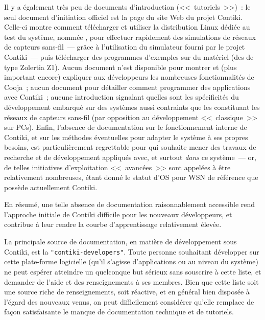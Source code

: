 Il y a également très peu de documents d'introduction (<<~tutoriels~>>)~:
le seul document d'initiation officiel est la page  du
site Web du projet Contiki. Celle-ci montre comment télécharger et utiliser
la distribution Linux dédiée au test du système, nommée , pour effectuer rapidement des simulations de réseaux de capteurs
sans-fil~--- grâce à l'utilisation du simulateur  \cite{Cooja}
fourni par le projet Contiki~--- puis télécharger des programmes d'exemples
sur du matériel (des  de type Zolertia Z1). Aucun document n'est
disponible pour montrer et (plus important encore) expliquer aux
développeurs les nombreuses fonctionnalités de Cooja~; aucun document pour
détailler comment programmer des applications avec Contiki~; aucune
introduction signalant quelles sont les spécificités du développement
embarqué sur des systèmes aussi contraints que les  constituant
les réseaux de capteurs sans-fil (par opposition au développement
<<~classique~>> sur PCs). Enfin, l'absence de documentation sur le
fonctionnement interne de Contiki, et sur les méthodes éventuelles
pour adapter le système à ses propres besoins, est particulièrement
regrettable pour qui souhaite mener des travaux de recherche et
de développement appliqués avec, et surtout \emph{dans} ce système~---
or, de telles initiatives d'exploitation <<~avancées~>> sont appelées
à être relativement nombreuses, étant donné le statut d'OS pour WSN
de référence que possède actuellement Contiki.

En résumé, une telle absence de documentation raisonnablement accessible
rend l'approche initiale de Contiki difficile pour les nouveaux développeurs,
et contribue à leur rendre la courbe d'apprentissage relativement élevée.

La principale source de documentation, en matière de développement sous
Contiki, est la 
\texttt{"contiki-developers"}\footnotemark[1].
Toute personne souhaitant développer sur cette plate-forme logicielle
(qu'il s'agisse d'applications ou au niveau du système) ne peut espérer
atteindre un quelconque but sérieux sans souscrire à cette liste, et
demander de l'aide et des renseignements à ses membres. Bien que cette
liste soit une source riche de renseignements, soit réactive, et en
général bien disposée à l'égard des nouveaux venus, on peut difficilement
considérer qu'elle remplace de façon satisfaisante le manque de
documentation technique et de tutoriels.


